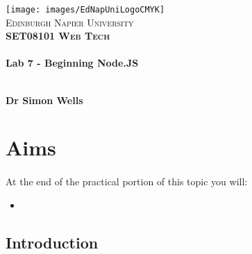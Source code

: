 \documentclass[10pt, a4paper, twosize]{article}
\begin{document}

\begin{titlepage}
\vspace*{5cm}
\begin{center}
\texttt{[image: images/EdNapUniLogoCMYK]}~\\[1cm]

\textsc{\Large Edinburgh Napier University}\\[1.5cm]

\textsc{\LARGE \bfseries SET08101 Web Tech}\\[0.5cm]

\hrulefill \\[0.4cm]
{\huge \bfseries Lab 7 - Beginning Node.JS\\[0.4cm]}
\hrulefill \\[1.5cm]

\begin{minipage}{0.4\textwidth}
\begin{flushleft} \large
\textbf{Dr Simon Wells} \\
\end{flushleft}
\end{minipage}

\vfill

\end{center}
\end{titlepage}




%

\section{Aims}
\paragraph{} At the end of the practical portion of this topic you will:

\begin{itemize}
\item 
\end{itemize}

\subsection{Introduction}
\end{document}
